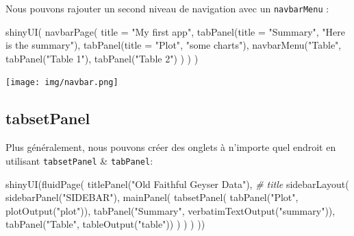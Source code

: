 \documentclass[
]{article}
\newenvironment{Shaded}{\begin{snugshade}}{\end{snugshade}}
\newcommand{\AttributeTok}[1]{\textcolor[rgb]{0.77,0.63,0.00}{#1}}
\newcommand{\CommentTok}[1]{\textcolor[rgb]{0.56,0.35,0.01}{\textit{#1}}}
\newcommand{\FunctionTok}[1]{\textcolor[rgb]{0.00,0.00,0.00}{#1}}
\newcommand{\NormalTok}[1]{#1}
\newcommand{\StringTok}[1]{\textcolor[rgb]{0.31,0.60,0.02}{#1}}
\begin{document}
Nous pouvons rajouter un second niveau de navigation avec un
\texttt{navbarMenu} :

\begin{Shaded}
\begin{Highlighting}[]
\FunctionTok{shinyUI}\NormalTok{(}
  \FunctionTok{navbarPage}\NormalTok{(}
    \AttributeTok{title =} \StringTok{"My first app"}\NormalTok{,}
    \FunctionTok{tabPanel}\NormalTok{(}\AttributeTok{title =} \StringTok{"Summary"}\NormalTok{,}
             \StringTok{"Here is the summary"}\NormalTok{),}
    \FunctionTok{tabPanel}\NormalTok{(}\AttributeTok{title =} \StringTok{"Plot"}\NormalTok{,}
             \StringTok{"some charts"}\NormalTok{),}
    \FunctionTok{navbarMenu}\NormalTok{(}\StringTok{"Table"}\NormalTok{,}
               \FunctionTok{tabPanel}\NormalTok{(}\StringTok{"Table 1"}\NormalTok{),}
               \FunctionTok{tabPanel}\NormalTok{(}\StringTok{"Table 2"}\NormalTok{)}
\NormalTok{    )}
\NormalTok{  )}
\NormalTok{)}
\end{Highlighting}
\end{Shaded}

\texttt{[image: img/navbar.png]}

\hypertarget{tabsetpanel}{%
\subsection{tabsetPanel}\label{tabsetpanel}}

Plus généralement, nous pouvons créer des onglets à n'importe quel
endroit en utilisant \texttt{tabsetPanel} \& \texttt{tabPanel}:

\begin{Shaded}
\begin{Highlighting}[]
\FunctionTok{shinyUI}\NormalTok{(}\FunctionTok{fluidPage}\NormalTok{(}
  \FunctionTok{titlePanel}\NormalTok{(}\StringTok{"Old Faithful Geyser Data"}\NormalTok{), }\CommentTok{\# title}
  \FunctionTok{sidebarLayout}\NormalTok{(}
    \FunctionTok{sidebarPanel}\NormalTok{(}\StringTok{"SIDEBAR"}\NormalTok{),}
    \FunctionTok{mainPanel}\NormalTok{(}
      \FunctionTok{tabsetPanel}\NormalTok{(}
        \FunctionTok{tabPanel}\NormalTok{(}\StringTok{"Plot"}\NormalTok{, }\FunctionTok{plotOutput}\NormalTok{(}\StringTok{"plot"}\NormalTok{)), }
        \FunctionTok{tabPanel}\NormalTok{(}\StringTok{"Summary"}\NormalTok{, }\FunctionTok{verbatimTextOutput}\NormalTok{(}\StringTok{"summary"}\NormalTok{)), }
        \FunctionTok{tabPanel}\NormalTok{(}\StringTok{"Table"}\NormalTok{, }\FunctionTok{tableOutput}\NormalTok{(}\StringTok{"table"}\NormalTok{))}
\NormalTok{      )}
\NormalTok{    )}
\NormalTok{  )}
\NormalTok{))}
\end{Highlighting}
\end{Shaded}
\end{document}
